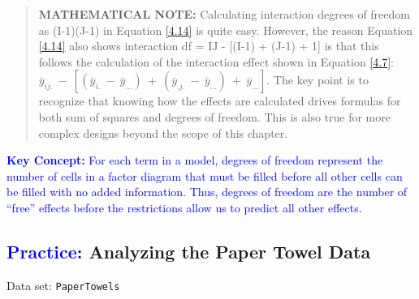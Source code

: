 \documentclass[
]{report}
\begin{document}
\begin{quote}
\textbf{MATHEMATICAL NOTE:} Calculating interaction degrees of freedom as (I-1)(J-1) in Equation \ref{4.14} is quite easy. However, the reason Equation \ref{4.14} also shows interaction df = IJ - {[}(I-1) + (J-1) + 1{]} is that this follows the calculation of the interaction effect shown in Equation \ref{4.7}: \(\scriptstyle \bar{y}_{ij.} \ -\  [(\bar{y}_{i.} \ -\  \bar{y}_{...}) \ +\  (\bar{y}_{.j.} \ -\  \bar{y}_{...}) \ +\  \bar{y}_{...}]\). The key point is to recognize that knowing how the effects are calculated drives formulas for both sum of squares and degrees of freedom. This is also true for more complex designs beyond the scope of this chapter.
\end{quote}

\textbf{\textcolor{blue}{Key Concept:}} \textcolor{blue}{For each term in a model, degrees of freedom represent the number of cells in a factor diagram that must be filled before all other cells can be filled with no added information. Thus, degrees of freedom are the number of “free” effects before the restrictions allow us to predict all other effects.}

\hypertarget{analyzing-the-paper-towel-data}{%
\subsection*{\texorpdfstring{\textcolor{blue}{Practice:} Analyzing the Paper Towel Data}{ Analyzing the Paper Towel Data}}\label{analyzing-the-paper-towel-data}}

\vspace{-1em}

Data set: \texttt{PaperTowels}
\end{document}
